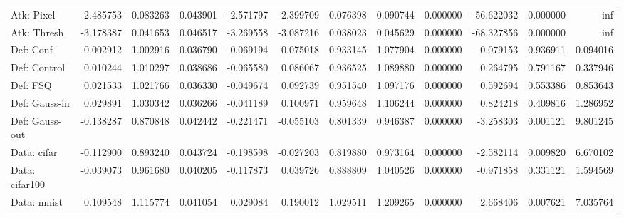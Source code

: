 \begin{table}[htbp]
\begin{tabular}{lrrrrrrrrrrr}
Atk: Pixel & -2.485753 & 0.083263 & 0.043901 & -2.571797 & -2.399709 & 0.076398 & 0.090744 & 0.000000 & -56.622032 & 0.000000 & inf \\
Atk: Thresh & -3.178387 & 0.041653 & 0.046517 & -3.269558 & -3.087216 & 0.038023 & 0.045629 & 0.000000 & -68.327856 & 0.000000 & inf \\
Def: Conf & 0.002912 & 1.002916 & 0.036790 & -0.069194 & 0.075018 & 0.933145 & 1.077904 & 0.000000 & 0.079153 & 0.936911 & 0.094016 \\
Def: Control & 0.010244 & 1.010297 & 0.038686 & -0.065580 & 0.086067 & 0.936525 & 1.089880 & 0.000000 & 0.264795 & 0.791167 & 0.337946 \\
Def: FSQ & 0.021533 & 1.021766 & 0.036330 & -0.049674 & 0.092739 & 0.951540 & 1.097176 & 0.000000 & 0.592694 & 0.553386 & 0.853643 \\
Def: Gauss-in & 0.029891 & 1.030342 & 0.036266 & -0.041189 & 0.100971 & 0.959648 & 1.106244 & 0.000000 & 0.824218 & 0.409816 & 1.286952 \\
Def: Gauss-out & -0.138287 & 0.870848 & 0.042442 & -0.221471 & -0.055103 & 0.801339 & 0.946387 & 0.000000 & -3.258303 & 0.001121 & 9.801245 \\
Data: cifar & -0.112900 & 0.893240 & 0.043724 & -0.198598 & -0.027203 & 0.819880 & 0.973164 & 0.000000 & -2.582114 & 0.009820 & 6.670102 \\
Data: cifar100 & -0.039073 & 0.961680 & 0.040205 & -0.117873 & 0.039726 & 0.888809 & 1.040526 & 0.000000 & -0.971858 & 0.331121 & 1.594569 \\
Data: mnist & 0.109548 & 1.115774 & 0.041054 & 0.029084 & 0.190012 & 1.029511 & 1.209265 & 0.000000 & 2.668406 & 0.007621 & 7.035764 \\
\bottomrule
\end{tabular}
\end{table}
